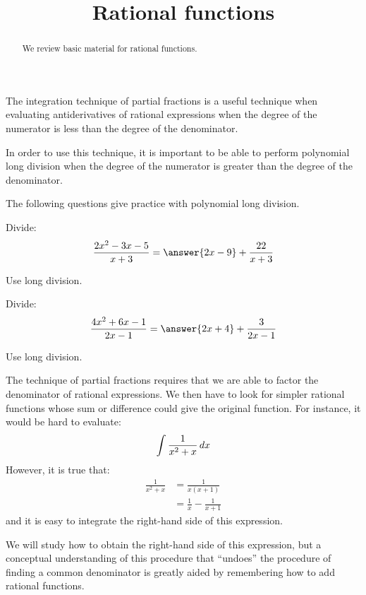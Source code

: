 \documentclass{ximera}
\title[Refresh:]{Rational functions}
\begin{document}
\begin{abstract}
  We review basic material for rational functions.
\end{abstract}
\maketitle

\begin{problem}
  The integration technique of partial fractions is a useful technique
  when evaluating antiderivatives of rational expressions when the
  degree of the numerator is less than the degree of the denominator.
  
  In order to use this technique, it is important to be able to
  perform polynomial long division when the degree of the numerator is
  greater than the degree of the denominator.

  
  The following questions give practice with polynomial long division.
  \begin{multipleChoice}
  \end{multipleChoice}
\end{problem}

\begin{problem}
  Divide:
  \[
  \frac{2x^2-3x-5}{x+3} = \answer{2x-9} + \frac{22}{x+3}
  \]
  \begin{hint}
    Use long division.
  \end{hint}
\end{problem}

\begin{problem}
  Divide:
  \[
  \frac{4x^2+6x-1}{2x-1} = \answer{2x+4} + \frac{3}{2x-1}
  \]
  \begin{hint}
    Use long division.
  \end{hint}
\end{problem}

\begin{problem}
  The technique of partial fractions requires that we are able to
  factor the denominator of rational expressions.  We then have to
  look for simpler rational functions whose sum or difference could
  give the original function. For instance, it would be hard to evaluate:
  \[
  \int \frac{1}{x^2+x}\mathop{}\!d x
  \]
  However, it is true that:
  \begin{align*}
    \frac{1}{x^2+x} &= \frac{1}{x(x+1)}\\
    &=\frac{1}{x}-\frac{1}{x+1}
  \end{align*}
  and it is easy to integrate the right-hand side of this expression.

  
  We will study how to obtain the right-hand side of this expression, but a conceptual understanding of this procedure that ``undoes'' the
  procedure of finding a common denominator is greatly aided by
  remembering how to add rational functions.
  \begin{multipleChoice}
  \end{multipleChoice}
\end{problem}
\end{document}
